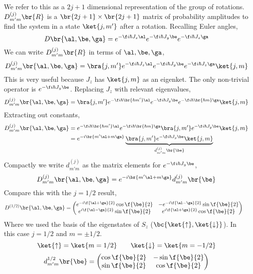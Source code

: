 \documentclass{article}
\begin{document}
We refer to this as a $2j+1$ dimensional representation of the group of rotations. $D^{(j)}_{m'm} \br{R}$ is a $\br{2j+1}\times\br{2j+1}$ matrix of probability amplitudes to find the system in a state $\ket{j,m'}$ after a rotation. Recalling Euler angles,
\[ D\br{\al, \be, \ga} = e^{-\f i \hbar J_z \al}e^{-\f i \hbar J_y \be}e^{-\f i \hbar J_z \ga} \]
We can write $D^{(j)}_{m'm} \br{R}$ in terms of $\al, \be, \ga$,
\[ D^{(j)}_{m'm} \br{\al, \be, \ga} = \bra{j,m'}e^{-\f i \hbar J_z \al}e^{-\f i \hbar J_y \be}e^{-\f i \hbar J_z \ga} \ket{j,m} \]
This is very useful because $J_z$ has $\ket{j,m}$ as an eigenket. The only non-trivial operator is $e^{-\f i \hbar J_y \be}$. Replacing $J_z$ with relevant eigenvalues,
\[ D^{(j)}_{m'm} \br{\al, \be, \ga} = \bra{j,m'}e^{-\f i \hbar \br{\hbar m'} \al}e^{-\f i \hbar J_y \be}e^{-\f i \hbar \br{\hbar m} \ga} \ket{j,m} \]
Extracting out constants,
\begin{align*}
D^{(j)}_{m'm} \br{\al, \be, \ga}
&= e^{-\f i \hbar \br{\hbar m'} \al}e^{-\f i \hbar \br{\hbar m} \ga}\bra{j,m'}e^{-\f i \hbar J_y \be} \ket{j,m} \\
&= e^{-i \br{m' \al + m \ga}}\underbrace{\bra{j,m'}e^{-\f i \hbar J_y \be} \ket{j,m}}_{d^{(j)}_{m'm}\br{\be}}
\end{align*}
Compactly we write $d^{(j)}_{m'm}$ as the matrix elements for $e^{-\f i \hbar J_y \be}$,
\[ D^{(j)}_{m'm} \br{\al, \be, \ga} = e^{-i \br{m' \al + m \ga}}d^{(j)}_{m'm}\br{\be} \]
Compare this with the $j = 1/2$ result,
\begin{align*}
    D^{(1/2)}\br{\al,\be,\ga}
    &= \begin{pmatrix}
        e^{- i \f{\al+\ga}{2}}\cos\f{\be}{2} & -e^{- i \f{\al-\ga}{2}}\sin\f{\be}{2} \\
        e^{ i \f{\al-\ga}{2}}\sin\f{\be}{2} & e^{ i \f{\al+\ga}{2}}\cos\f{\be}{2} \\
    \end{pmatrix}
\end{align*}
Where we used the basis of the eigenstates of $S_z$ ($\bc{\ket{\uparrow}, \ket{\downarrow}}$). In this case $j = 1/2$ and $m=\pm 1/2$.
\[ \ket{\uparrow} = \ket{m=1/2} \qquad \ket{\downarrow} = \ket{m=-1/2} \]
\[ d_{m'm}^{1/2}\br{\be} = \begin{pmatrix}
    \cos \f{\be}{2} & -\sin \f{\be}{2} \\
    \sin \f{\be}{2} & \cos \f{\be}{2} \\
\end{pmatrix} \]
\end{document}
